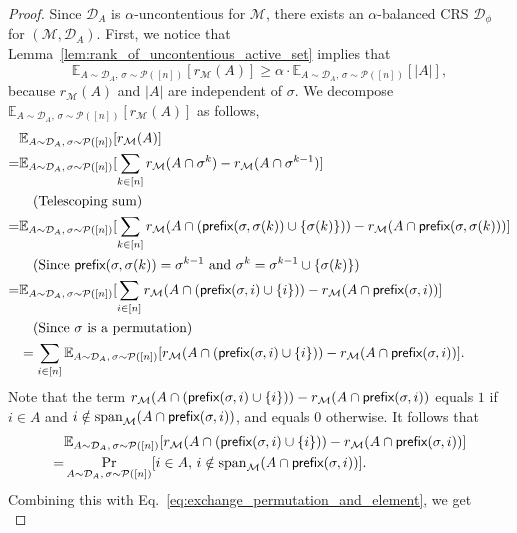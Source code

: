 \documentclass[11pt]{article}
\newcommand{\D}{\mathcal D}
\def \E {\mathbb{E}}
\newcommand{\M}{{\mathcal M}}
\newcommand{\cP}{\mathcal P}
\newcommand{\pref}{\textnormal{\sffamily prefix}}
\newcommand{\spa}{\textnormal{span}}
\begin{document}
\begin{proof}
Since $\D_A$ is $\alpha$-uncontentious for $\M$, there exists an $\alpha$-balanced CRS $\D_{\phi}$ for $(\M,\D_A)$. First, we notice that Lemma~\ref{lem:rank_of_uncontentious_active_set} implies that
\begin{equation}\label{eq:rank_vs_cardinality_randomly_permuted}
    \E_{A\sim\D_A,\,\sigma\sim\cP([n])}[r_{\M}(A)]\ge\alpha\cdot\E_{A\sim\D_A,\,\sigma\sim\cP([n])}[|A|],
\end{equation}
because $r_{\M}(A)$ and $|A|$ are independent of $\sigma$. We decompose $\E_{A\sim\D_A,\,\sigma\sim\cP([n])}[r_{\M}(A)]$ as follows,
\begin{align}\label{eq:exchange_permutation_and_element}
    &\E_{A\sim\D_A,\,\sigma\sim\cP([n])}[r_{\M}(A)]\nonumber\\
    =&\E_{A\sim\D_A,\,\sigma\sim\cP([n])}[\sum_{k\in[n]}r_{\M}(A\cap \sigma^k)-r_{\M}(A\cap \sigma^{k-1})]\nonumber\\
    &\quad\text{(Telescoping sum)}\nonumber\\
    =&\E_{A\sim\D_A,\,\sigma\sim\cP([n])}[\sum_{k\in[n]}r_{\M}(A\cap (\pref(\sigma,\sigma(k))\cup\{\sigma(k)\}))-r_{\M}(A\cap \pref(\sigma,\sigma(k)))]\nonumber\\
    &\quad\text{(Since $\pref(\sigma,\sigma(k))=\sigma^{k-1}$ and $\sigma^k=\sigma^{k-1}\cup\{\sigma(k)\}$)}\nonumber\\
    =&\E_{A\sim\D_A,\,\sigma\sim\cP([n])}[\sum_{i\in[n]}r_{\M}(A\cap (\pref(\sigma,i)\cup\{i\}))-r_{\M}(A\cap \pref(\sigma,i))]\nonumber\\
    &\quad\text{(Since $\sigma$ is a permutation)}\nonumber\\
    &=\sum_{i\in[n]}\E_{A\sim\D_A,\,\sigma\sim\cP([n])}[r_{\M}(A\cap (\pref(\sigma,i)\cup\{i\}))-r_{\M}(A\cap \pref(\sigma,i))].
\end{align}
Note that the term $r_{\M}(A\cap (\pref(\sigma,i)\cup\{i\}))-r_{\M}(A\cap \pref(\sigma,i))$ equals $1$ if $i\in A$ and $i\notin\spa_{\M}(A\cap \pref(\sigma,i))$, and equals $0$ otherwise. It follows that
\begin{align*}\label{eq:rank_marginal_gain}
    &\E_{A\sim\D_A,\,\sigma\sim\cP([n])}[r_{\M}(A\cap (\pref(\sigma,i)\cup\{i\}))-r_{\M}(A\cap \pref(\sigma,i))]\\
    =&\Pr_{A\sim\D_A,\,\sigma\sim\cP([n])}[i\in A,\,i\notin \spa_{\M}(A\cap \pref(\sigma,i))].
\end{align*}
Combining this with Eq.~\eqref{eq:exchange_permutation_and_element}, we get
\begin{equation}\label{eq:randomly_permuted_rank}

\end{equation}
\end{proof}
\end{document}
